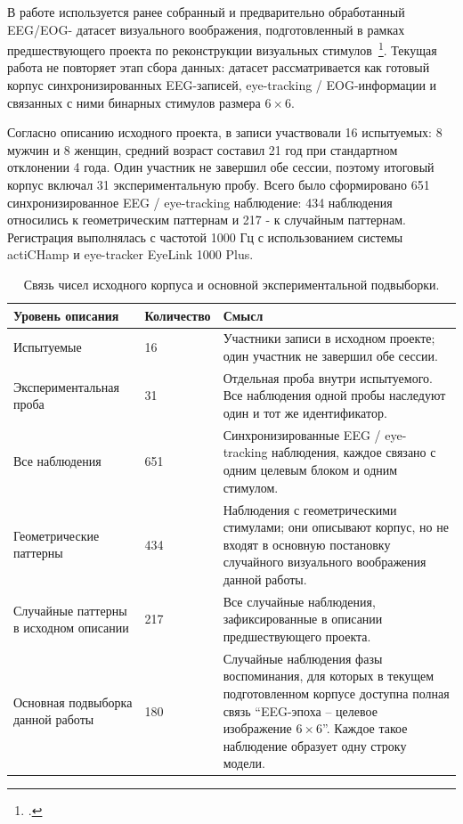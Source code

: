 В работе используется ранее собранный и предварительно обработанный EEG/EOG-
датасет визуального воображения, подготовленный в рамках предшествующего
проекта по реконструкции визуальных стимулов~\footcite{dementyev2025visualstimuli}.
Текущая работа не повторяет этап сбора данных: датасет рассматривается как
готовый корпус синхронизированных EEG-записей, eye-tracking / EOG-информации и
связанных с ними бинарных стимулов размера $6 \times 6$.

Согласно описанию исходного проекта, в записи участвовали 16 испытуемых: 8
мужчин и 8 женщин, средний возраст составил 21 год при стандартном отклонении
4 года. Один участник не завершил обе сессии, поэтому итоговый корпус включал
31 экспериментальную пробу. Всего было сформировано 651 синхронизированное EEG / eye-tracking
наблюдение: 434 наблюдения относились к геометрическим паттернам и 217 - к
случайным паттернам. Регистрация выполнялась с частотой 1000 Гц с
использованием системы actiCHamp и eye-tracker EyeLink 1000 Plus.

\begin{table}[!t]
  \centering
  \small
  \setlength{\tabcolsep}{3pt}
  \renewcommand{\arraystretch}{1.15}
  \caption{Связь чисел исходного корпуса и основной экспериментальной подвыборки.}
  \label{tab:dataset-counts}
  \begin{tabularx}{\textwidth}{|L{34mm}|L{24mm}|Y|}
    \hline
    Уровень описания & Количество & Смысл \\
    \hline
    Испытуемые &
    16 &
    Участники записи в исходном проекте; один участник не завершил обе сессии. \\
    \hline
    Экспериментальная проба &
    31 &
    Отдельная проба внутри испытуемого. Все наблюдения одной пробы наследуют
    один и тот же идентификатор. \\
    \hline
    Все наблюдения &
    651 &
    Синхронизированные EEG / eye-tracking наблюдения, каждое связано с одним
    целевым блоком и одним стимулом. \\
    \hline
    Геометрические паттерны &
    434 &
    Наблюдения с геометрическими стимулами; они описывают корпус, но не входят
    в основную постановку случайного визуального воображения данной работы. \\
    \hline
    Случайные паттерны в исходном описании &
    217 &
    Все случайные наблюдения, зафиксированные в описании предшествующего
    проекта. \\
    \hline
    Основная подвыборка данной работы &
    180 &
    Случайные наблюдения фазы воспоминания, для которых в текущем
    подготовленном корпусе доступна полная связь ``EEG-эпоха -- целевое
    изображение $6 \times 6$''. Каждое такое наблюдение образует одну строку
    модели. \\
    \hline
  \end{tabularx}
\end{table}

